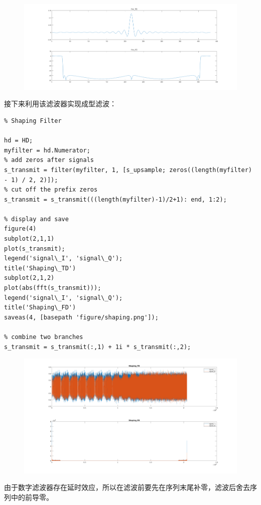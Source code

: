 \begin{spacing}{1.5}
\begin{figure}[H]
\centering
\includegraphics[width = \columnwidth]{filter.png}
\end{figure}

接下来利用该滤波器实现成型滤波：

\begin{lstlisting}
% Shaping Filter

hd = HD;
myfilter = hd.Numerator;
% add zeros after signals
s_transmit = filter(myfilter, 1, [s_upsample; zeros((length(myfilter) - 1) / 2, 2)]);
% cut off the prefix zeros
s_transmit = s_transmit(((length(myfilter)-1)/2+1): end, 1:2);

% display and save
figure(4)
subplot(2,1,1)
plot(s_transmit);
legend('signal\_I', 'signal\_Q');
title('Shaping\_TD')
subplot(2,1,2)
plot(abs(fft(s_transmit)));
legend('signal\_I', 'signal\_Q');
title('Shaping\_FD')
saveas(4, [basepath 'figure/shaping.png']);

% combine two branches
s_transmit = s_transmit(:,1) + 1i * s_transmit(:,2);
\end{lstlisting}

\begin{figure}[H]
\centering
\includegraphics[width = \columnwidth]{shaping.png}
\end{figure}

由于数字滤波器存在延时效应，所以在滤波前要先在序列末尾补零，滤波后舍去序列中的前导零。


\end{spacing}
